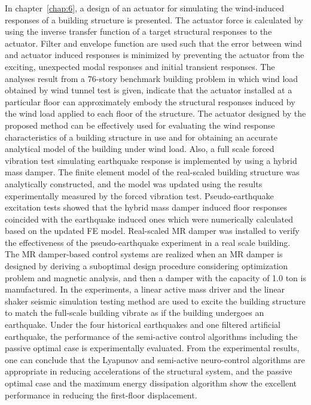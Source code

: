 In chapter~\ref{chap:6}, a design of an actuator for simulating the wind-induced responses of a building structure is presented. The actuator force is calculated by using the inverse transfer function of a target structural responses to the actuator. Filter and envelope function are used such that the error between wind and actuator induced responses is minimized by preventing the actuator from the exciting, unexpected modal responses and initial transient responses. The analyses result from a 76-story benchmark building problem in which wind load obtained by wind tunnel test is given, indicate that the actuator installed at a particular floor can approximately embody the structural responses induced by the wind load applied to each floor of the structure. The actuator designed by the proposed method can be effectively used for evaluating the wind response characteristics of a building structure in use and for obtaining an accurate analytical model of the building under wind load. Also, a full scale forced vibration test simulating earthquake response is implemented by using a hybrid mass damper. The finite element model of the real-scaled building structure was analytically constructed, and the model was updated using the results experimentally measured by the forced vibration test. Pseudo-earthquake excitation tests showed that the hybrid mass damper induced floor responses coincided with the earthquake induced ones which were numerically calculated based on the updated FE model. Real-scaled MR damper was installed to verify the effectiveness of the pseudo-earthquake experiment in a real scale building. The MR damper-based control systems are realized when an MR damper is designed by deriving a suboptimal design procedure considering optimization problem and magnetic analysis, and then a damper with the capacity of 1.0 ton is manufactured. In the experiments, a linear active mass driver and the linear shaker seismic simulation testing method are used to excite the building structure to match the full-scale building vibrate as if the building undergoes an earthquake. Under the four historical earthquakes and one filtered artificial earthquake, the performance of the semi-active control algorithms including the passive optimal case is experimentally evaluated. From the experimental results, one can conclude that the Lyapunov and semi-active neuro-control algorithms are appropriate in reducing accelerations of the structural system, and the passive optimal case and the maximum energy dissipation algorithm show the excellent performance in reducing the first-floor displacement.

